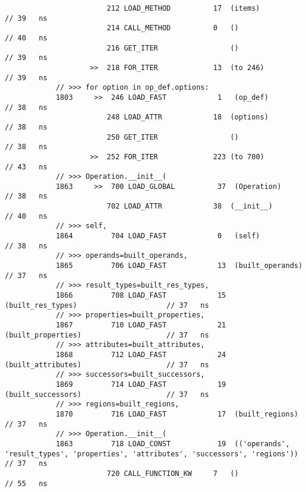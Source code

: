 \begin{code}
\begin{verbatim}
                        212 LOAD_METHOD          17  (items)                                // 39   ns
                        214 CALL_METHOD          0   ()                                     // 40   ns
                        216 GET_ITER                 ()                                     // 39   ns
                    >>  218 FOR_ITER             13  (to 246)                               // 39   ns
            // >>> for option in op_def.options:
            1803     >>  246 LOAD_FAST            1   (op_def)                              // 38   ns
                        248 LOAD_ATTR            18  (options)                              // 38   ns
                        250 GET_ITER                 ()                                     // 38   ns
                    >>  252 FOR_ITER             223 (to 700)                               // 43   ns
            // >>> Operation.__init__(
            1863     >>  700 LOAD_GLOBAL          37  (Operation)                           // 38   ns
                        702 LOAD_ATTR            38  (__init__)                             // 40   ns
            // >>> self,
            1864         704 LOAD_FAST            0   (self)                                // 38   ns
            // >>> operands=built_operands,
            1865         706 LOAD_FAST            13  (built_operands)                      // 37   ns
            // >>> result_types=built_res_types,
            1866         708 LOAD_FAST            15  (built_res_types)                     // 37   ns
            // >>> properties=built_properties,
            1867         710 LOAD_FAST            21  (built_properties)                    // 37   ns
            // >>> attributes=built_attributes,
            1868         712 LOAD_FAST            24  (built_attributes)                    // 37   ns
            // >>> successors=built_successors,
            1869         714 LOAD_FAST            19  (built_successors)                    // 37   ns
            // >>> regions=built_regions,
            1870         716 LOAD_FAST            17  (built_regions)                       // 37   ns
            // >>> Operation.__init__(
            1863         718 LOAD_CONST           19  (('operands', 'result_types', 'properties', 'attributes', 'successors', 'regions'))  // 37   ns
                        720 CALL_FUNCTION_KW     7   ()                                     // 55   ns


\end{verbatim}
\end{code}
